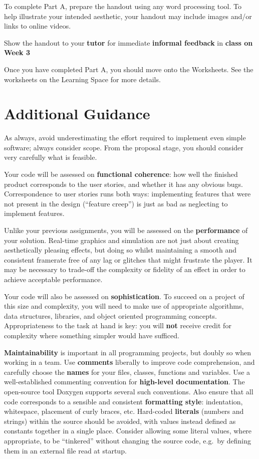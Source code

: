 \documentclass{../../fal_assignment}
\begin{document}
To complete Part A, prepare the handout using any word processing tool.
To help illustrate your intended aesthetic, your handout may include images and/or links to online videos.

Show the handout to your \textbf{tutor} for immediate \textbf{informal feedback} in \textbf{class on Week 3}

Once you have completed Part A, you should move onto the Worksheets. See the worksheets on the Learning Space for more details.  

\section*{Additional Guidance}

As always, avoid underestimating the effort required to implement even simple software; always consider scope.
From the proposal stage, you should consider very carefully what is feasible.

Your code will be assessed on \textbf{functional coherence}:
how well the finished product corresponds to the user stories,
and whether it has any obvious bugs.
Correspondence to user stories runs both ways:
implementing features that were not present in the design (``feature creep'')
is just as bad as neglecting to implement features.

Unlike your previous assignments,
you will be assessed on the \textbf{performance} of your solution.
Real-time graphics and simulation are not just about creating aesthetically pleasing effects,
but doing so whilst maintaining a smooth and consistent framerate free of any lag or glitches that might frustrate the player.
It may be necessary to trade-off the complexity or fidelity of an effect
in order to achieve acceptable performance.

Your code will also be assessed on \textbf{sophistication}.
To succeed on a project of this size and complexity,
you will need to make use of appropriate algorithms, data structures, libraries, and object oriented programming concepts.
Appropriateness to the task at hand is key:
you will \textbf{not} receive credit for complexity  
where something simpler would have sufficed.

\textbf{Maintainability} is important in all programming projects,
but doubly so when working in a team.
Use \textbf{comments} liberally to improve code comprehension,
and carefully choose the \textbf{names} for your files, classes, functions and variables.
Use a well-established commenting convention
for \textbf{high-level documentation}.
The open-source tool Doxygen supports several such conventions.
Also ensure that all code corresponds to a sensible and consistent \textbf{formatting style}:
indentation, whitespace, placement of curly braces, etc.
Hard-coded \textbf{literals} (numbers and strings) within the source should be avoided,
with values instead defined as constants together in a single place.
Consider allowing some literal values, where appropriate, to be ``tinkered'' without changing the source code,
e.g.\ by defining them in an external file read at startup.
\end{document}
